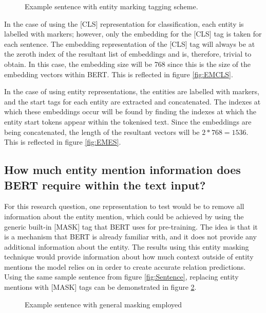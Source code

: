 \documentclass{l4proj}
\begin{document}
\begin{figure}[h]
    \centering
  \caption{Example sentence with entity marking tagging scheme.}
  \label{fig:Tagging}
\end{figure}

In the case of using the [CLS] representation for classification, each entity is labelled with markers; however, only the embedding for the [CLS] tag is taken for each sentence. The embedding representation of the [CLS] tag will always be at the zeroth index of the resultant list of embeddings and is, therefore, trivial to obtain. In this case, the embedding size will be 768 since this is the size of the embedding vectors within BERT. This is reflected in figure \ref{fig:EMCLS}.

In the case of using entity representations, the entities are labelled with markers, and the start tags for each entity are extracted and concatenated. The indexes at which these embeddings occur will be found by finding the indexes at which the entity start tokens appear within the tokenised text. Since the embeddings are being concatenated, the length of the resultant vectors will be $2*768 = 1536$. This is reflected in figure \ref{fig:EMES}.

\subsection{How much entity mention information does BERT require within the text input?}

For this research question, one representation to test would be to remove all information about the entity mention, which could be achieved by using the generic built-in [MASK] tag that BERT uses for pre-training. The idea is that it is a mechanism that BERT is already familiar with, and it does not provide any additional information about the entity. The results using this entity masking technique would provide information about how much context outside of entity mentions the model relies on in order to create accurate relation predictions. Using the same sample sentence from figure \ref{fig:Sentence}, replacing entity mentions with [MASK] tags can be demonstrated in figure \ref{fig:Mask}.

\begin{figure}[h]
    \centering
  \caption{Example sentence with general masking employed}
  \label{fig:Mask}
\end{figure}
\end{document}
